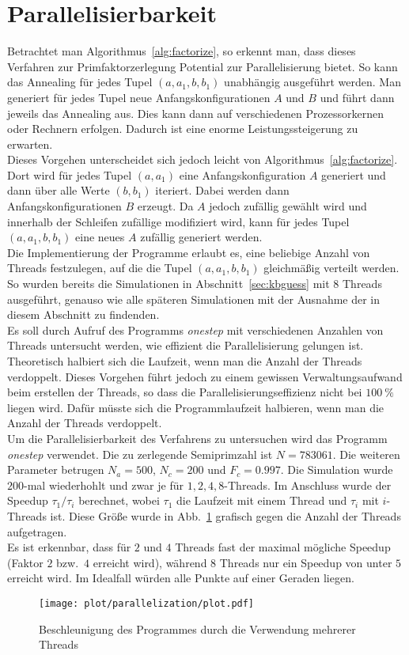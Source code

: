 \section{Parallelisierbarkeit}\label{sec:parallel}
Betrachtet man Algorithmus~\ref{alg:factorize}, so erkennt man, dass dieses Verfahren zur Primfaktorzerlegung Potential zur Parallelisierung bietet. So kann das Annealing für jedes Tupel $\left(a,a_1,b,b_1\right)$ unabhängig ausgeführt werden. Man generiert für jedes Tupel neue Anfangskonfigurationen $A$ und $B$ und führt dann jeweils das Annealing aus. Dies kann dann auf verschiedenen Prozessorkernen oder Rechnern erfolgen. Dadurch ist eine enorme Leistungssteigerung zu erwarten.\\
Dieses Vorgehen unterscheidet sich jedoch leicht von Algorithmus~\ref{alg:factorize}. Dort wird für jedes Tupel $\left(a,a_1\right)$ eine Anfangskonfiguration $A$ generiert und dann über alle Werte $\left(b,b_1\right)$ iteriert. Dabei werden dann Anfangskonfigurationen $B$ erzeugt. Da $A$ jedoch zufällig gewählt wird und innerhalb der Schleifen zufällige modifiziert wird, kann für jedes Tupel $\left(a,a_1,b,b_1\right)$ eine neues $A$ zufällig generiert werden. \\
Die Implementierung der Programme erlaubt es, eine beliebige Anzahl von Threads festzulegen, auf die die Tupel $\left(a,a_1,b,b_1\right)$ gleichmäßig verteilt werden. So wurden bereits die Simulationen in Abschnitt~\ref{sec:kbguess} mit $8$ Threads ausgeführt, genauso wie alle späteren Simulationen mit der Ausnahme der in diesem Abschnitt zu findenden. \\
Es soll durch Aufruf des Programms \textit{onestep} mit verschiedenen Anzahlen von Threads untersucht werden, wie effizient die Parallelisierung gelungen ist. Theoretisch halbiert sich die Laufzeit, wenn man die Anzahl der Threads verdoppelt. Dieses Vorgehen führt jedoch zu einem gewissen Verwaltungsaufwand beim erstellen der Threads, so dass die Parallelisierungseffizienz nicht bei $\SI{100}{\percent}$ liegen wird. Dafür müsste sich die Programmlaufzeit halbieren, wenn man die Anzahl der Threads verdoppelt.\\
Um die Parallelisierbarkeit des Verfahrens zu untersuchen wird das Programm \textit{onestep} verwendet. Die zu zerlegende Semiprimzahl ist $N=783061$. Die weiteren Parameter betrugen $N_a=500$, $N_c=200$ und $F_c=0.997$. Die Simulation wurde $200$-mal wiederhohlt und zwar je für $1, 2, 4, 8$-Threads. Im Anschluss wurde der Speedup $\tau_1/\tau_i$ berechnet, wobei $\tau_1$ die Laufzeit mit einem Thread und $\tau_i$ mit $i$-Threads ist. Diese Größe wurde in Abb.~\ref{fig:speedup} grafisch gegen die Anzahl der Threads aufgetragen.\\
Es ist erkennbar, dass für $2$ und $4$ Threads fast der maximal mögliche Speedup (Faktor $2$ bzw.\ $4$ erreicht wird), während $8$ Threads nur ein Speedup von unter $5$ erreicht wird. Im Idealfall würden alle Punkte auf einer Geraden liegen.
\begin{figure}[ht]
		\centering
		\texttt{[image: plot/parallelization/plot.pdf]}
		\caption{Beschleunigung des Programmes durch die Verwendung mehrerer Threads}\label{fig:speedup}
\end{figure}

